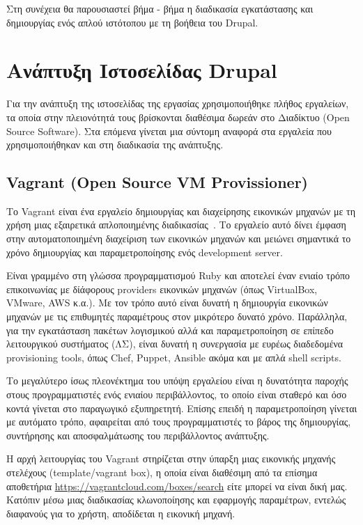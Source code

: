 \documentclass[12pt]{report}
\begin{document}
Στη συνέχεια θα παρουσιαστεί βήμα - βήμα η διαδικασία εγκατάστασης και δημιουργίας ενός απλού ιστότοπου με τη βοήθεια του \textlatin{Drupal}.

\chapter{Ανάπτυξη Ιστοσελίδας \textlatin{Drupal}}\label{ch3}
Για την ανάπτυξη της ιστοσελίδας της εργασίας χρησιμοποιήθηκε πλήθος εργαλείων, τα οποία στην πλειονότητά τους βρίσκονται διαθέσιμα δωρεάν στο Διαδίκτυο (\textlatin{Open Source Software}). Στα επόμενα γίνεται μια σύντομη αναφορά στα εργαλεία που χρησιμοποιήθηκαν και στη διαδικασία της ανάπτυξης.

\section{\textlatin{\textlatin{Vagrant (Open Source VM Provissioner)}}}\label{vagrant}
Το \textlatin{Vagrant} είναι ένα εργαλείο δημιουργίας και διαχείρησης εικονικών μηχανών με τη χρήση μιας εξαιρετικά απλοποιημένης διαδικασίας~\cite{vagrant_by_hashicorp}. Το εργαλείο αυτό δίνει έμφαση στην αυτοματοποιημένη διαχείριση των εικονικών μηχανών και μειώνει σημαντικά το χρόνο δημιουργίας και παραμετροποίησης ενός \textlatin{development server}.

Είναι γραμμένο στη γλώσσα προγραμματισμού \textlatin{Ruby} και αποτελεί έναν ενιαίο τρόπο επικοινωνίας με δίάφορους \textlatin{providers} εικονικών μηχανών (όπως \textlatin{VirtualBox, VMware, AWS} κ.α.). Με τον τρόπο αυτό είναι δυνατή η δημιουργία εικονικών μηχανών με τις επιθυμητές παραμέτρους στον μικρότερο δυνατό χρόνο. Παράλληλα, για την εγκατάσταση πακέτων λογισμικού αλλά και παραμετροποίηση σε επίπεδο λειτουργικού συστήματος (ΛΣ), είναι δυνατή η συνεργασία με ευρέως διαδεδομένα \textlatin{provisioning tools}, όπως \textlatin{Chef, Puppet, Ansible} ακόμα και με απλά \textlatin{shell scripts}.

Το μεγαλύτερο ίσως πλεονέκτημα του υπόψη εργαλείου είναι η δυνατότητα παροχής στους προγραμματιστές ενός ενιαίου περιβάλλοντος, το οποίο είναι σταθερό και όσο κοντά γίνεται στο παραγωγικό εξυπηρετητή. Επίσης επειδή η παραμετροποίηση γίνεται με αυτόματο τρόπο, αφαιρείται από τους προγραμματιστές το βάρος της δημιουργίας, συντήρησης και αποσφαλμάτωσης του περιβάλλοντος ανάπτυξης.

Η αρχή λειτουργίας του \textlatin{Vagrant} στηρίζεται στην ύπαρξη μιας εικονικής μηχανής στελέχους (\textlatin{template/vagrant box}), η οποία είναι διαθέσιμη από τα επίσημα αποθετήρια \textlatin{\url{https://vagrantcloud.com/boxes/search}} είτε μπορεί να είναι δική μας. Κατόπιν μέσω μιας διαδικασίας κλωνοποίησης και εφαρμογής παραμέτρων, εντελώς διαφανούς για το χρήστη, αποδίδεται η εικονική μηχανή.
\end{document}
